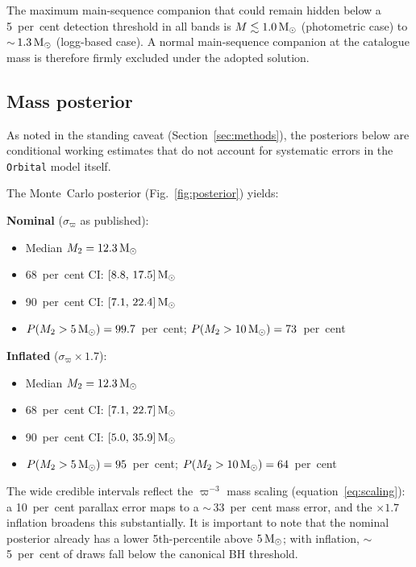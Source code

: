 \documentclass[usenatbib,fleqn]{mnras}
\newcommand{\Msun}{{\rm M}_\odot}
\begin{document}
The maximum main-sequence companion that could remain hidden below
a 5~per~cent detection threshold in all bands is
$M \lesssim 1.0\,\Msun$ (photometric case) to
$\sim$\,$1.3\,\Msun$ (logg-based case).  A normal main-sequence
companion at the catalogue mass is therefore firmly excluded
under the adopted solution.

\subsection{Mass posterior}
\label{sec:results:posterior}

As noted in the standing caveat (Section~\ref{sec:methods}),
the posteriors below are conditional working estimates that
do not account for systematic errors in the \texttt{Orbital}
model itself.

The Monte~Carlo posterior (Fig.~\ref{fig:posterior}) yields:

\medskip
\noindent\textbf{Nominal} ($\sigma_\varpi$ as published):
\begin{itemize}
\item Median $M_2 = 12.3\,\Msun$
\item 68~per~cent CI: $[8.8,\,17.5]\,\Msun$
\item 90~per~cent CI: $[7.1,\,22.4]\,\Msun$
\item $P(M_2 > 5\,\Msun) = 99.7$~per~cent;
  $P(M_2 > 10\,\Msun) = 73$~per~cent
\end{itemize}

\medskip
\noindent\textbf{Inflated} ($\sigma_\varpi \times 1.7$):
\begin{itemize}
\item Median $M_2 = 12.3\,\Msun$
\item 68~per~cent CI: $[7.1,\,22.7]\,\Msun$
\item 90~per~cent CI: $[5.0,\,35.9]\,\Msun$
\item $P(M_2 > 5\,\Msun) = 95$~per~cent;
  $P(M_2 > 10\,\Msun) = 64$~per~cent
\end{itemize}

\medskip
The wide credible intervals reflect the $\varpi^{-3}$ mass
scaling (equation~\ref{eq:scaling}): a 10~per~cent parallax
error maps to a $\sim$\,33~per~cent mass error, and the
$\times 1.7$ inflation broadens this substantially.  It is
important to note that the nominal posterior already has a
lower 5th-percentile above $5\,\Msun$; with inflation,
$\sim$\,5~per~cent of draws fall below the canonical BH
threshold.
\end{document}
